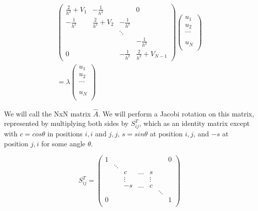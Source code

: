 \documentclass[twocolumn, groupedaddress]{revtex4-1}
\begin{document}
\begin{align}
\left( \begin{array}{cccc}
\frac{2}{h^2} + V_1  &    -\frac{1}{h^2}   &                &            0            \\
   -\frac{1}{h^2}    & \frac{2}{h^2} + V_2 & -\frac{1}{h^2} &                         \\
                     &                     &     \ddots     &                         \\
                     &                     &                &     -\frac{1}{h^2}      \\
         0           &                     & -\frac{1}{h^2} & \frac{2}{h^2} + V_{N-1}
\end{array} \right)
\left( \begin{array}{cccc}
 u_1  \\
 u_2  \\
\dots \\
      \\
      \\
u_{N} \\
\end{array} \right)									\nonumber \\
 = \lambda
\left( \begin{array}{cccc}
 u_1  \\
 u_2  \\
\dots \\
      \\
      \\
u_{N} \\
\end{array} \right)
\end{align}

We will call the NxN matrix $\hat{A}$. We will perform a Jacobi rotation on this matrix, represented by multiplying both sides by $S_{ij}^T$, which as an identity matrix except with $c=cos\theta$ in positions $i,i$ and $j,j$, $s=sin\theta$ at position $i,j$, and $-s$ at position $j,i$ for some angle $\theta$.

\begin{equation}
S_{ij}^T = 
\left( \begin{array}{ccccccc}
1 &       &       &       &       &     &        0 \\
	 &\ddots &     &       &       &     &              \\
	 &       &  c    & \dots&  s    &     &              \\
	 &       &\vdots &       & \vdots&     &              \\
	 &       &   -s  & \dots &   c   &     &              \\
	 &       &       &       &       &\ddots&             \\
0 &       &       &       &       &     &   1  \\
\end{array} \right)
\end{equation} 
\end{document}
